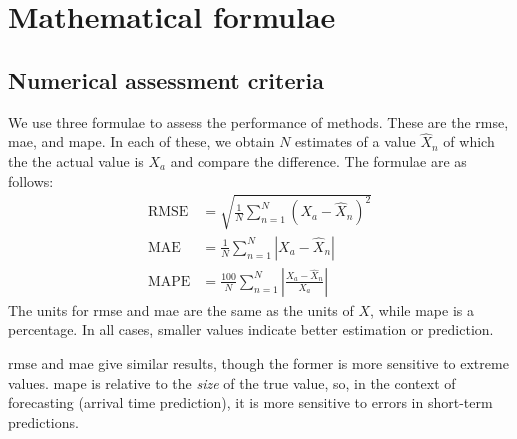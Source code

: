\chapter{Mathematical formulae}
\label{app:math}

\section{Numerical assessment criteria}
\label{app:error-functions}

We use three formulae to assess the performance of methods. These are the \acrfull{rmse}, \acrfull{mae}, and \acrfull{mape}. In each of these, we obtain $N$ estimates of a value $\hat X_n$ of which the the actual value is $X_a$ and compare the difference. The formulae are as follows:
\begin{align}
\label{eq:app_rmse}
\text{RMSE} &= \sqrt{\frac{1}{N}\sum_{n=1}^N \left(X_a - \hat X_n\right)^2} \\
\label{eq:app_mae}
\text{MAE} &= \frac{1}{N}\sum_{n=1}^N \left|X_a - \hat X_n\right| \\
\label{eq:app_mape}
\text{MAPE} &= \frac{100}{N}\sum_{n=1}^N \left|\frac{X_a - \hat X_n}{X_a}\right|
\end{align}
The units for \gls{rmse} and \gls{mae} are the same as the units of $X$, while \gls{mape} is a percentage. In all cases, smaller values indicate better estimation or prediction.


\gls{rmse} and \gls{mae} give similar results, though the former is more sensitive to extreme values. \gls{mape} is relative to the \emph{size} of the true value, so, in the context of forecasting (arrival time prediction), it is more sensitive to errors in short-term predictions.
